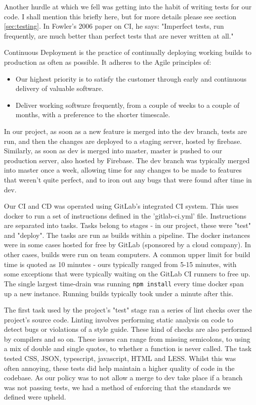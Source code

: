 \documentclass{l3proj}
\begin{document}
Another hurdle at which we fell was getting into the habit of writing tests for our code. I shall
 mention this briefly here, but for more details please see section \ref{sec:testing}. In Fowler's
 2006 paper on CI, he says: "Imperfect tests, run frequently, are much better than perfect tests
 that are never written at all."\cite{fowler2006continuous}

Continuous Deployment is the practice of continually deploying working builds to production
 as often as possible. It adheres to the Agile principles of:
 \begin{itemize}
 \item
 Our highest priority is to satisfy the customer
 through early and continuous delivery
 of valuable software. \cite{agileprinciples}
 \item
 Deliver working software frequently, from a
 couple of weeks to a couple of months, with a
 preference to the shorter timescale. \cite{agileprinciples}
 \end{itemize}
 In our project, as soon as a new feature is merged into the dev branch,
 tests are run, and then the changes are deployed to a staging server, hosted by firebase. Similarly,
 as soon as dev is merged into master, master is pushed to our production server, also hosted by Firebase.
 The dev branch was typically merged into master once a week, allowing time for any changes to be made
 to features that weren't quite perfect, and to iron out any bugs that were found after time in dev.

Our CI and CD was operated using GitLab's integrated CI system. This uses docker to
 run a set of instructions defined in the 'gitlab-ci.yml' file.  Instructions are
 separated into tasks. Tasks belong to stages - in our project, these were
 "test" and "deploy". The tasks are run as builds within a pipeline. The docker instances were
 in some cases hosted for free by GitLab (sponsored by a cloud company). In other cases,
 builds were run on team computers. A common upper limit for build time is quoted as
 10 minutes\cite{fowler2006continuous} - ours typically ranged from 5-15 minutes, with some exceptions that were
 typically waiting on the GitLab CI runners to free up. The single largest time-drain was
 running \texttt{npm install} every time docker span up a new instance. Running builds
 typically took under a minute after this.

 

The first task used by the project's "test" stage ran a series of lint checks over the
 project's source code. Linting involves performing static analysis on code to detect bugs
 or violations of a style guide. These kind of checks are also performed by compilers and
 so on. These issues can range from missing semicolons, to using a mix of
 double and single quotes, to whether a function is never called. The task tested CSS,
 JSON, typescript, javascript,  HTML and LESS. Whilst this was often annoying, these tests
 did help maintain a higher quality of code in the codebase. As our policy was to not allow a
 merge to dev take place if a branch was not passing tests, we had a method of
 enforcing that the standards we defined were upheld.
\end{document}
